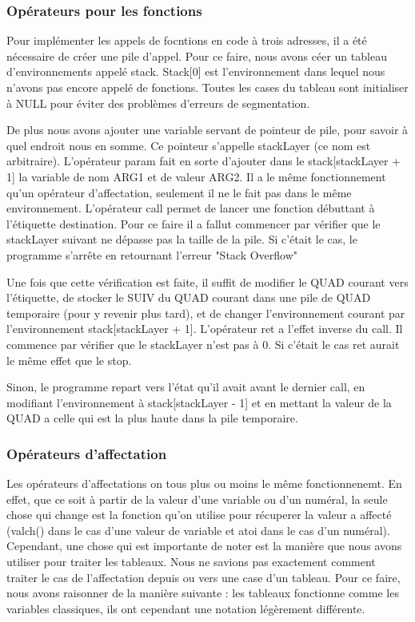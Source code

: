 \documentclass{article}
\begin{document}
\subsubsection{Opérateurs pour les fonctions}

Pour implémenter les appels de focntions en code à trois adresses, il a été nécessaire de créer une pile d'appel.
Pour ce faire, nous avons céer un tableau d'environnements appelé stack. Stack[0] est l'environnement dans lequel nous n'avons pas encore appelé de fonctions.
Toutes les cases du tableau sont initialiser à NULL pour éviter des problèmes d'erreurs de segmentation.

De plus nous avons ajouter une variable servant de pointeur de pile, pour savoir à quel endroit nous en somme. Ce pointeur s'appelle stackLayer (ce nom est arbitraire).
\bigbreak
L'opérateur param fait en sorte d'ajouter dans le stack[stackLayer + 1] la variable de nom ARG1 et de valeur ARG2. Il a le même fonctionnement qu'un opérateur d'affectation, seulement il ne le fait pas dans le même environnement.
\medbreak
L'opérateur call permet de lancer une fonction débuttant à l'étiquette destination. Pour ce faire il a fallut commencer par vérifier que le stackLayer suivant ne dépasse pas la taille de la pile.
Si c'était le cas, le programme s'arrête en retournant l'erreur "Stack Overflow"

Une fois que cette vérification est faite, il suffit de modifier le QUAD courant vers l'étiquette, de stocker le SUIV du QUAD courant dans une pile de QUAD temporaire (pour y revenir plus tard), et de changer l'environnement courant par l'environnement stack[stackLayer + 1].
\medbreak
L'opérateur ret a l'effet inverse du call. Il commence par vérifier que le stackLayer n'est pas à 0. Si c'était le cas ret aurait le même effet que le stop.

Sinon, le programme repart vers l'état qu'il avait avant le dernier call, en modifiant l'environnement à stack[stackLayer - 1] et en mettant la valeur de la QUAD a celle qui est la plus haute dans la pile temporaire.

\subsubsection{Opérateurs d'affectation}

Les opérateurs d'affectations on tous plus ou moins le même fonctionnenemt. En effet, que ce soit à partir de la valeur d'une variable ou d'un numéral, la seule chose qui change est la fonction qu'on utilise pour récuperer la valeur a affecté (valch() dans le cas d'une valeur de variable et atoi dans le cas d'un numéral).
Cependant, une chose qui est importante de noter est la manière que nous avons utiliser pour traiter les tableaux.
\medbreak
Nous ne savions pas exactement comment traiter le cas de l'affectation depuis ou vers une case d'un tableau.
Pour ce faire, nous avons raisonner de la manière suivante : les tableaux fonctionne comme les variables classiques, ils ont cependant une notation légèrement différente.
\end{document}

